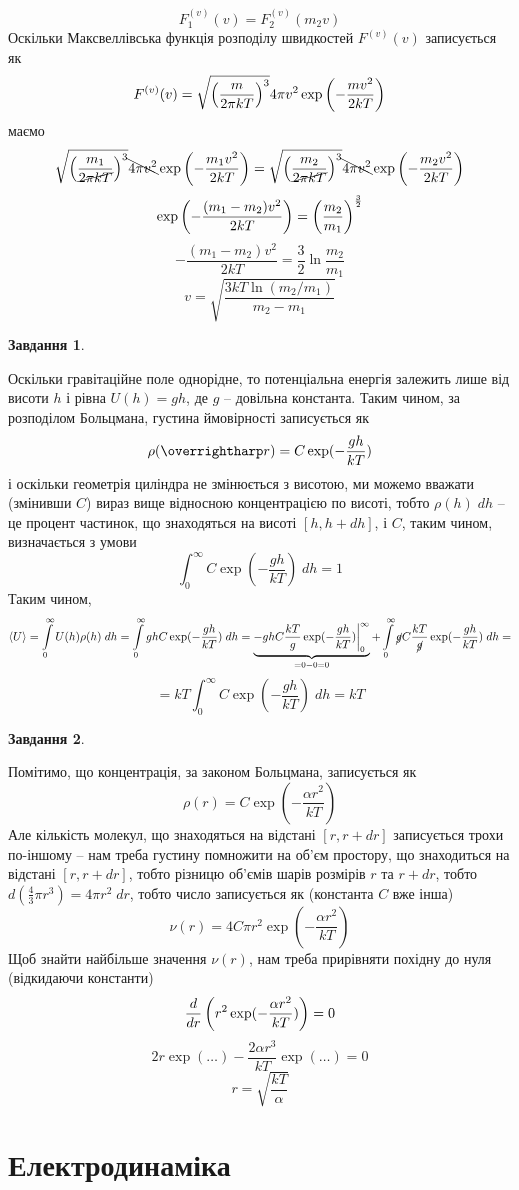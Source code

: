 \documentclass[12pt]{article} %
\newtheorem{prob}{Завдання}
\begin{document}
	\[F^{(v)}_1(v)=F^{(v)}_2(m_2v)\]
	Оскільки Максвеллівська функція розподілу швидкостей $F^{(v)}(v)$ записується як
	\[F^{(v)}(v)=\sqrt{\left(\frac{m}{2\pi kT}\right)^3}4\pi v^2\exp\left(-\frac{mv^2}{2kT}\right)\]
	маємо
	\[\sqrt{\left(\frac{m_1}{\cancel{2\pi kT}}\right)^3}\bcancel{4\pi v^2}\exp\left(-\frac{m_1v^2}{2kT}\right)
	=\sqrt{\left(\frac{m_2}{\cancel{2\pi kT}}\right)^3}\bcancel{4\pi v^2}\exp\left(-\frac{m_2v^2}{2kT}\right)\]
	\[\exp\left(-\frac{(m_1-m_2)v^2}{2kT}\right)=\left(\frac{m_2}{m_1}\right)^{\frac{3}{2}}\]
	\[{-\frac{(m_1-m_2)v^2}{2kT}}=\frac{3}{2}\ln{\frac{m_2}{m_1}}\]
	\[v=\sqrt{\frac{3kT\ln(m_2/m_1)}{m_2-m_1}}\]
\begin{prob}\end{prob}%
	Оскільки гравітаційне поле однорідне, то потенціальна енергія залежить лише від висоти $h$ і рівна $U(h)=gh$, де $g$ -- довільна
	константа. Таким чином, за розподілом Больцмана, густина ймовірності записується як
	\[\rho(\myvec{r})=C\exp(-\frac{gh}{kT})\]
	і оскільки геометрія циліндра не змінюється з висотою, ми можемо вважати (змінивши $C$) вираз вище відносною концентрацією по висоті,
	тобто $\rho(h)\;dh$ -- це процент частинок, що знаходяться на висоті $[h,h+dh]$, і $C$, таким чином, визначається з умови
	\[\int_0^\infty C\exp(-\frac{gh}{kT})\;dh=1\]
	Таким чином,
	\[\myabra{U}=\int_0^\infty U(h)\rho(h)\;dh=\int_0^\infty ghC\exp(-\frac{gh}{kT})\;dh=\underbrace{
	-ghC\frac{kT}{g}\exp(-\frac{gh}{kT})\bigg|_0^\infty}_{=0-0=0}
	+\int_0^\infty \cancel{g}C\frac{kT}{\cancel{g}}\exp(-\frac{gh}{kT})\;dh=\]
	\[=kT\int_0^\infty C\exp(-\frac{gh}{kT})\;dh=kT\]
\begin{prob}\end{prob}%
	Помітимо, що концентрація, за законом Больцмана, записується як
	\[\rho(r)=C\exp(-\frac{\alpha r^2}{kT})\]
	Але кількість молекул, що знаходяться на відстані $[r,r+dr]$ записується трохи по-іншому -- нам треба густину помножити на 
	об’єм простору, що знаходиться на відстані $[r,r+dr]$, тобто різницю об’ємів шарів розмірів $r$ та $r+dr$, тобто $d(\frac{4}{3}\pi r^3)=
	4\pi r^2\;dr$, тобто число записується як (константа $C$ вже інша)
	\[\nu(r)=4C\pi r^2\exp(-\frac{\alpha r^2}{kT})\]
	Щоб знайти найбільше значення $\nu(r)$, нам треба прирівняти похідну до нуля (відкидаючи константи)
	\[\frac{d}{dr}\left(r^2\exp(-\frac{\alpha r^2}{kT})\right)=0\]
	\[2 r\exp(\hdots)-\frac{2 \alpha r^3}{kT}\exp(\hdots)=0\]
	\[r=\sqrt{\frac{kT}{\alpha}}\]
\section{Електродинаміка}
\end{document}
